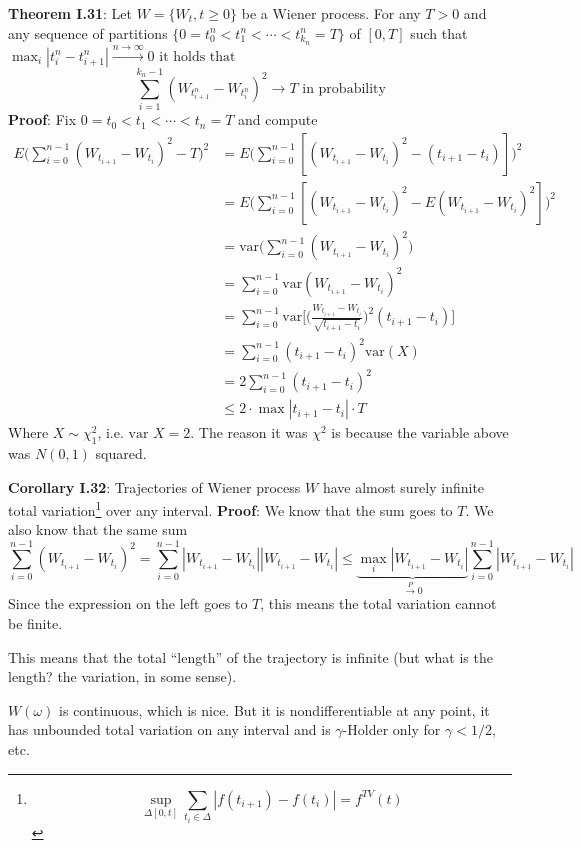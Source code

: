 \documentclass[english]{article}
\newcommand{\ub}{\underbrace}
\newcommand{\note}[1]{\noindent\textbf{#1}}
\begin{document}
\note{Theorem I.31}: Let $W=\{W_t, t\geq 0\}$ be a Wiener process. For any $T>0$ and any sequence of partitions $\{0 = t^n_0 < t^n_1 < \cdots < t^n_{k_n} = T \}$ of $[0,T]$ such that 
$\max_{i} |t^n_i - t^n_{i+1}| \stackrel{n\to \infty} \to 0 \text{ it holds that }$
$$\sum^{k_n -1}_{i=1} (W_{t^n_{i+1}} - W_{t^n_i})^2 \to T \text{ in probability}$$
\textbf{Proof}: Fix $0=t_0 < t_1 < \cdots < t_n = T$ and compute
\begin{align*}
E\Big( \sum^{n-1}_{i=0} (W_{t_{i+1}} - W_{t_i})^2 - T \Big)^2 &= E\Big(\sum^{n-1}_{i=0} [(W_{t_{i+1}} - W_{t_i})^2-(t_{i+1} - t_i)]\Big)^2 \\
& = E\Big(\sum^{n-1}_{i=0} [(W_{t_{i+1}} - W_{t_i})^2-E(W_{t_{i+1}} - W_{t_i})^2] \Big)^2\\
& = \text{var}\Big(\sum^{n-1}_{i=0} (W_{t_{i+1}} - W_{t_i})^2 \Big) \\
& = \sum^{n-1}_{i=0} \text{var} (W_{t_{i+1}} - W_{t_i})^2 \\
& = \sum^{n-1}_{i=0} \text{var} \bigg[ \Big(\frac{W_{t_{i+1}}-W_{t_i}}{\sqrt{t_{i+1} - t_i}}\Big)^2 (t_{i+1} - t_i) \bigg] \\
& = \sum^{n-1}_{i=0} (t_{i+1} - t_i)^2 \text{var}(X) \\
& = 2 \sum^{n-1}_{i=0} (t_{i+1} - t_i)^2 \\
& \leq 2\cdot \max |t_{i+1} - t_i| \cdot T
\end{align*}
Where $X\sim \chi^2_1$, i.e. $\text{var }X=2$. The reason it was $\chi^2$ is because the variable above was $N(0,1)$ squared. \newline

\note{Corollary I.32}: Trajectories of Wiener process $W$ have almost surely infinite total variation\footnote{$$\sup_{\Delta[0,t]} \sum_{t_i \in \Delta} |f(t_{i+1}) - f(t_i)| = f^{TV}(t)$$} over any interval.\newline
\textbf{Proof}: We know that the sum goes to $T$. We also know that the same sum
$$\sum^{n-1}_{i=0} (W_{t_{i+1}} - W_{t_i})^2 = \sum^{n-1}_{i=0} |W_{t_{i+1}} - W_{t_i}||W_{t_{i+1}} - W_{t_i}| \leq \ub{\max_i |W_{t_{i+1}} - W_{t_i}|}_{\stackrel P\to 0} \sum^{n-1}_{i=0} |W_{t_{i+1}} - W_{t_i}|$$
Since the expression on the left goes to $T$, this means the total variation cannot be finite.\newline

This means that the total ``length'' of the trajectory is infinite (but what is the length? the variation, in some sense). 

$W(\omega)$ is continuous, which is nice. But it is nondifferentiable at any point, it has unbounded total variation on any interval and is $\gamma$-Holder only for $\gamma < 1/2$, etc.
\end{document}
